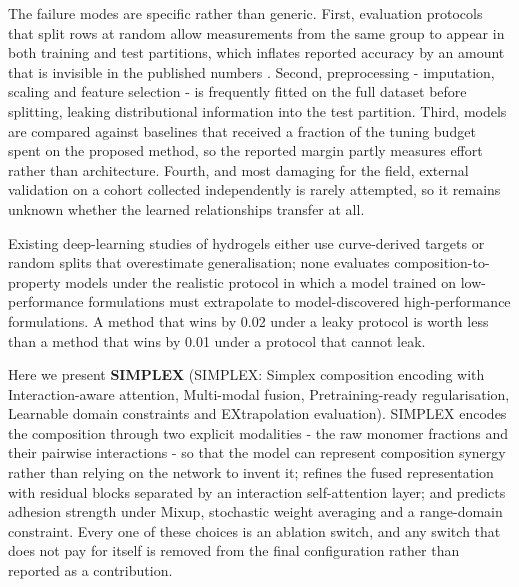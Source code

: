 \documentclass[utf8]{FrontiersinHarvard}
\begin{document}
The failure modes are specific rather than generic. First, evaluation protocols that split rows at random allow measurements from the same group to appear in both training and test partitions, which inflates reported accuracy by an amount that is invisible in the published numbers \cite{ovadia2019uncertainty,quinonero2009dataset,krueger2021outofdistribution}. Second, preprocessing - imputation, scaling and feature selection - is frequently fitted on the full dataset before splitting, leaking distributional information into the test partition. Third, models are compared against baselines that received a fraction of the tuning budget spent on the proposed method, so the reported margin partly measures effort rather than architecture. Fourth, and most damaging for the field, external validation on a cohort collected independently is rarely attempted, so it remains unknown whether the learned relationships transfer at all.

Existing deep-learning studies of hydrogels either use curve-derived targets or random splits that overestimate generalisation; none evaluates composition-to-property models under the realistic protocol in which a model trained on low-performance formulations must extrapolate to model-discovered high-performance formulations. \cite{mouret2017realitygap,shen2021ood} A method that wins by 0.02 under a leaky protocol is worth less than a method that wins by 0.01 under a protocol that cannot leak.

Here we present \textbf{SIMPLEX} (SIMPLEX: Simplex composition encoding with Interaction-aware attention, Multi-modal fusion, Pretraining-ready regularisation, Learnable domain constraints and EXtrapolation evaluation). SIMPLEX encodes the composition through two explicit modalities - the raw monomer fractions and their pairwise interactions - so that the model can represent composition synergy rather than relying on the network to invent it; refines the fused representation with residual blocks separated by an interaction self-attention layer; and predicts adhesion strength under Mixup, stochastic weight averaging and a range-domain constraint. Every one of these choices is an ablation switch, and any switch that does not pay for itself is removed from the final configuration rather than reported as a contribution.
\end{document}

